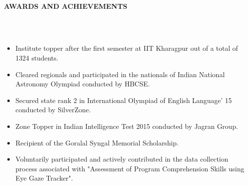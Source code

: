 \documentclass[letter,10pt]{book}
\newcommand{\lsep}{-0.5cm}
\newcommand{\resheading}[1]{{\small \colorbox{mygrey}{\begin{minipage}{0.975\textwidth}{\textbf{#1 \vphantom{p\^{E}}}}\end{minipage}}}}
\begin{document}
\hspace{0.5cm}\\[-0.2cm]
\resheading{\textbf{AWARDS AND ACHIEVEMENTS} }\\[\lsep]
\\[-1em]
\begin{itemize}
\item Institute topper after the first semester at IIT Kharagpur out of a total of 1324 students. 
\\[-2em]
\item Cleared regionals and participated in the nationals of Indian National Astronomy Olympiad conducted by HBCSE.
\\[-2em]
\item Secured state rank 2 in International Olympiad of English Language’ 15
conducted by SilverZone.
\\[-2em]
\item Zone Topper in Indian Intelligence Test 2015 conducted by Jagran Group.
\\[-2em]
\item Recipient of the Goralal Syngal Memorial Scholarship.
\\[-2em]
\item Voluntarily participated and actively contributed in the data collection process associated with "Assessment of Program Comprehension Skills using Eye Gaze Tracker".
\\[-2em]
\end{itemize}
\end{document}
